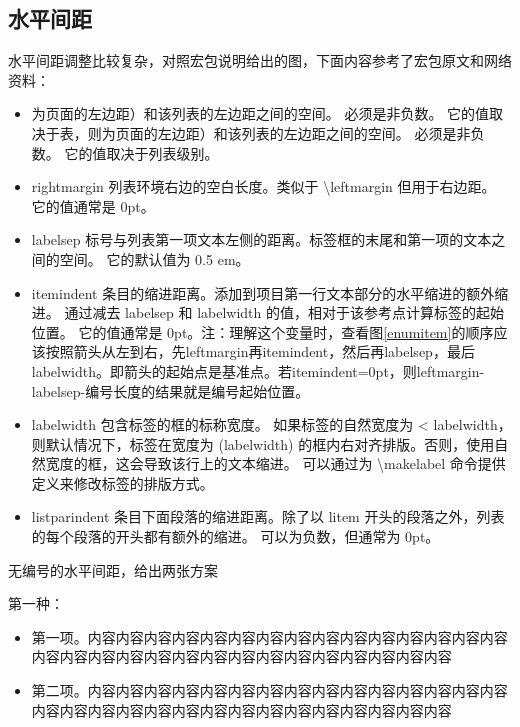 \subsection{水平间距}
水平间距调整比较复杂，对照宏包说明给出的图，下面内容参考了宏包原文和网络资料：
\begin{itemize}[topsep = 0 pt, itemsep= 0 pt, parsep=0pt, partopsep=0pt, leftmargin=36pt, itemindent=0pt, labelsep=6pt, listparindent=24pt]
	\item 为页面的左边距）和该列表的左边距之间的空间。 必须是非负数。 它的值取决于表，则为页面的左边距）和该列表的左边距之间的空间。 必须是非负数。 它的值取决于列表级别。
	\item rightmargin       列表环境右边的空白长度。类似于 \textbackslash{}leftmargin 但用于右边距。 它的值通常是 0pt。
	\item labelsep       标号与列表第一项文本左侧的距离。标签框的末尾和第一项的文本之间的空间。 它的默认值为 0.5 em。
	\item itemindent       条目的缩进距离。添加到项目第一行文本部分的水平缩进的额外缩进。 通过减去 labelsep 和 labelwidth 的值，相对于该参考点计算标签的起始位置。 它的值通常是 0pt。注：理解这个变量时，查看图\ref{enumitem}的顺序应该按照箭头从左到右，先leftmargin再itemindent，然后再labelsep，最后labelwidth。即箭头的起始点是基准点。若itemindent=0pt，则leftmargin-labelsep-编号长度的结果就是编号起始位置。
	\item labelwidth       包含标签的框的标称宽度。 如果标签的自然宽度为 < labelwidth，则默认情况下，标签在宽度为 (labelwidth) 的框内右对齐排版。否则，使用自然宽度的框，这会导致该行上的文本缩进。 可以通过为 \textbackslash{}makelabel 命令提供定义来修改标签的排版方式。
	\item listparindent       条目下面段落的缩进距离。除了以 litem 开头的段落之外，列表的每个段落的开头都有额外的缩进。 可以为负数，但通常为 0pt。
\end{itemize}

无编号的水平间距，给出两张方案
 
第一种：
\begin{itemize}[topsep = 0 pt, itemsep= 0 pt, parsep=0pt, partopsep=0pt, leftmargin=36pt, itemindent=0pt, labelsep=6pt, listparindent=24pt]
	\item 第一项。内容内容内容内容内容内容内容内容内容内容内容内容内容内容内容内容内容内容内容内容内容内容内容内容内容内容内容内容内容内容

	\item 第二项。内容内容内容内容内容内容内容内容内容内容内容内容内容内容内容内容内容内容内容内容内容内容内容内容内容内容内容内容内容内容
	
\end{itemize}


